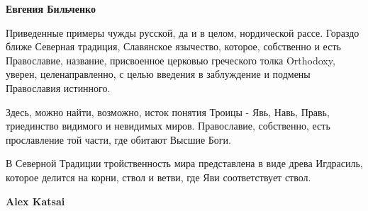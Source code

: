 \begin{itemize}
\begin{itemize}
 
\textbf{Евгения Бильченко} 

Приведенные примеры чужды русской, да и в целом, нордической рассе. Гораздо
ближе Северная традиция, Славянское язычество, которое, собственно и есть
Православие, название, присвоенное церковью греческого толка Orthodoxy, уверен,
целенаправленно, с целью введения в заблуждение и подмены Православия
истинного.

Здесь, можно найти, возможно, исток понятия Троицы - Явь, Навь, Правь,
триединство видимого и невидимых миров. Православие, собственно, есть
прославление той части, где обитают Высшие Боги.

В Северной Традиции тройственность мира представлена в виде древа Игдрасиль,
которое делится на корни, ствол и ветви, где Яви соответствует ствол.


 
\textbf{Alex Katsai} 


\end{itemize}
\end{itemize}
